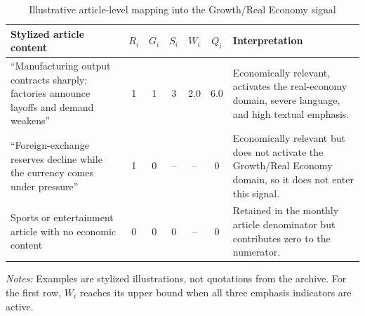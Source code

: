 \begin{table}[htbp]
\centering\scriptsize
\caption{Illustrative article-level mapping into the Growth/Real Economy signal}
\label{tab:worked_example}
\begin{tabularx}{\textwidth}{p{}cccccX}
\toprule
Stylized article content & $R_i$ & $G_i$ & $S_i$ & $W_i$ & $Q_i$ & Interpretation \\
\midrule
``Manufacturing output contracts sharply; factories announce layoffs and demand weakens'' & 1 & 1 & 3 & 2.0 & 6.0 & Economically relevant, activates the real-economy domain, severe language, and high textual emphasis. \\
``Foreign-exchange reserves decline while the currency comes under pressure'' & 1 & 0 & -- & -- & 0 & Economically relevant but does not activate the Growth/Real Economy domain, so it does not enter this signal. \\
Sports or entertainment article with no economic content & 0 & 0 & 0 & -- & 0 & Retained in the monthly article denominator but contributes zero to the numerator. \\
\bottomrule
\end{tabularx}
\vspace{0.3em}
\begin{minipage}{0.96\textwidth}\normalsize\textit{Notes:} Examples are stylized illustrations, not quotations from the archive. For the first row, $W_i$ reaches its upper bound when all three emphasis indicators are active.\end{minipage}
\end{table}
